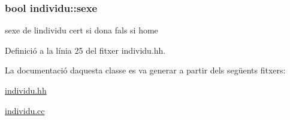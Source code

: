 \subsubsection[{\texorpdfstring{sexe}{sexe}}]{\setlength{\rightskip}{0pt plus 5cm}bool individu\+::sexe\hspace{0.3cm}{\ttfamily [private]}}\hypertarget{classindividu_ab62faa6985cc0520c33a206fc5a89e37}{}\label{classindividu_ab62faa6985cc0520c33a206fc5a89e37}


sexe de l\textquotesingle{}individu cert si dona fals si home 



Definició a la línia 25 del fitxer individu.\+hh.



La documentació d\textquotesingle{}aquesta classe es va generar a partir dels següents fitxers\+:\begin{DoxyCompactItemize}
\item 
\hyperlink{individu_8hh}{individu.\+hh}\item 
\hyperlink{individu_8cc}{individu.\+cc}\end{DoxyCompactItemize}
